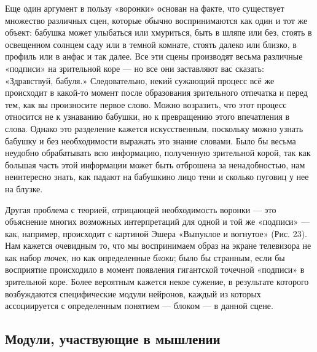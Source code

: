 \documentclass[../main.tex]{subfiles}
\begin{document}
Еще один аргумент в пользу «воронки» основан на факте, что существует множество различных сцен, которые обычно воспринимаются как один и тот же объект: бабушка может улыбаться или хмуриться, быть в шляпе или без, стоять в освещенном солнцем саду или в темной комнате, стоять далеко или близко, в профиль или в анфас и так далее. Все эти сцены производят весьма различные «подписи» на зрительной коре --- но все они заставляют вас сказать: «Здравствуй, бабуля.» Следовательно, некий сужающий процесс всё же происходит в какой-то момент после образования зрительного отпечатка и перед тем, как вы произносите первое слово. Можно возразить, что этот процесс относится не к узнаванию бабушки, но к превращению этого впечатления в слова. Однако это разделение кажется искусственным, поскольку можно узнать бабушку и без необходимости выражать это знание словами. Было бы весьма неудобно обрабатывать всю информацию, полученную зрительной корой, так как большая часть этой информации может быть отброшена за ненадобностью, нам неинтересно знать, как падают на бабушкино лицо тени и сколько пуговиц у нее на блузке.

Другая проблема с теорией, отрицающей необходимость воронки --- это объяснение многих возможных интерпретаций для одной и той же «подписи» --- как, например, происходит с картиной Эшера «Выпуклое и вогнутое» (Рис. 23). Нам кажется очевидным то, что мы воспринимаем образ на экране телевизора не как набор \emph{точек}, но как определенные \emph{блоки}; было бы странным, если бы восприятие происходило в момент появления гигантской точечной «подписи» в зрительной коре. Более вероятным кажется некое сужение, в результате которого возбуждаются специфические модули нейронов, каждый из которых ассоциируется с определенным понятием --- блоком --- в данной сцене.~~

\subsection{Модули, участвующие в мышлении}
\end{document}
